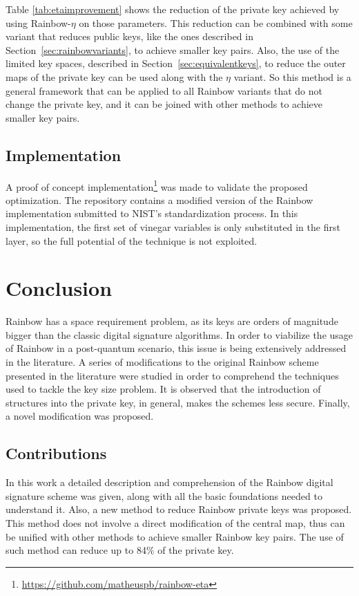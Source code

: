 \documentclass{ufsctex/ufsctex}
\begin{document}
Table \ref{tab:etaimprovement} shows the reduction of the private key achieved
by using Rainbow-$\eta$ on those parameters. This reduction can be combined
with some variant that reduces public keys, like the ones described in
Section~\ref{sec:rainbowvariants}, to achieve smaller key pairs. Also, the use
of the limited key spaces, described in Section~\ref{sec:equivalentkeys}, to
reduce the outer maps of the private key can be used along with the $\eta$
variant. So this method is a general framework that can be applied to all
Rainbow variants that do not change the private key, and it can be joined with
other methods to achieve smaller key pairs.

\section{Implementation}

A proof of concept
implementation\footnote{\url{https://github.com/matheuspb/rainbow-eta}} was
made to validate the proposed optimization. The repository contains a modified
version of the Rainbow implementation submitted to NIST's standardization
process. In this implementation, the first set of vinegar variables is only
substituted in the first layer, so the full potential of the technique is not
exploited.

\chapter{Conclusion}

Rainbow has a space requirement problem, as its keys are orders of magnitude
bigger than the classic digital signature algorithms. In order to viabilize the
usage of Rainbow in a post-quantum scenario, this issue is being extensively
addressed in the literature. A series of modifications to the original Rainbow
scheme presented in the literature were studied in order to comprehend the
techniques used to tackle the key size problem. It is observed that the
introduction of structures into the private key, in general, makes the schemes
less secure. Finally, a novel modification was proposed.

\section{Contributions}

In this work a detailed description and comprehension of the Rainbow digital
signature scheme was given, along with all the basic foundations needed to
understand it. Also, a new method to reduce Rainbow private keys was proposed.
This method does not involve a direct modification of the central map, thus can
be unified with other methods to achieve smaller Rainbow key pairs. The use of
such method can reduce up to 84\% of the private key.
\end{document}
